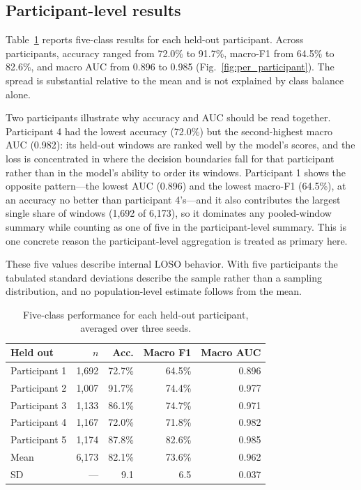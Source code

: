 \documentclass[pdflatex,sn-nature,iicol]{sn-jnl}
\begin{document}
\subsection{Participant-level results}

Table~\ref{tab:persubject} reports five-class results for each held-out participant. Across participants, accuracy ranged from 72.0\% to 91.7\%, macro-F1 from 64.5\% to 82.6\%, and macro AUC from 0.896 to 0.985 (Fig.~\ref{fig:per_participant}). The spread is substantial relative to the mean and is not explained by class balance alone.

Two participants illustrate why accuracy and AUC should be read together. Participant 4 had the lowest accuracy (72.0\%) but the second-highest macro AUC (0.982): its held-out windows are ranked well by the model's scores, and the loss is concentrated in where the decision boundaries fall for that participant rather than in the model's ability to order its windows. Participant 1 shows the opposite pattern---the lowest AUC (0.896) and the lowest macro-F1 (64.5\%), at an accuracy no better than participant 4's---and it also contributes the largest single share of windows (1,692 of 6,173), so it dominates any pooled-window summary while counting as one of five in the participant-level summary. This is one concrete reason the participant-level aggregation is treated as primary here.

These five values describe internal LOSO behavior. With five participants the tabulated standard deviations describe the sample rather than a sampling distribution, and no population-level estimate follows from the mean.

\begin{table}[h]
  \caption{Five-class performance for each held-out participant, averaged over three seeds.}
  \label{tab:persubject}
  \centering
  \footnotesize
  \begin{tabular*}{\columnwidth}{@{\extracolsep{\fill}}lrrrr@{}}
    \toprule
    Held out & $n$ & Acc. & Macro F1 & Macro AUC \\
    \midrule
    Participant 1 & 1,692 & 72.7\% & 64.5\% & 0.896 \\
    Participant 2 & 1,007 & 91.7\% & 74.4\% & 0.977 \\
    Participant 3 & 1,133 & 86.1\% & 74.7\% & 0.971 \\
    Participant 4 & 1,167 & 72.0\% & 71.8\% & 0.982 \\
    Participant 5 & 1,174 & 87.8\% & 82.6\% & 0.985 \\
    \midrule
    Mean & 6,173 & 82.1\% & 73.6\% & 0.962 \\
    SD & --- & 9.1 & 6.5 & 0.037 \\
    \bottomrule
  \end{tabular*}
\end{table}
\end{document}
